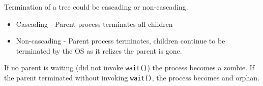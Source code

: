 \documentclass[]{article}
\begin{document}
Termination of a tree could be cascading or non-cascading.
\begin{itemize}
    \item Cascading - Parent process terminates all children
    \item Non-cascading - Parent process terminates, children continue to be terminated by the OS as it relizes the parent is gone.
\end{itemize}

If no parent is waiting (did not invoke \verb|wait()|) the process
becomes a zombie.
If the parent terminated without invoking \verb|wait()|, the
process becomes and orphan.
\end{document}
